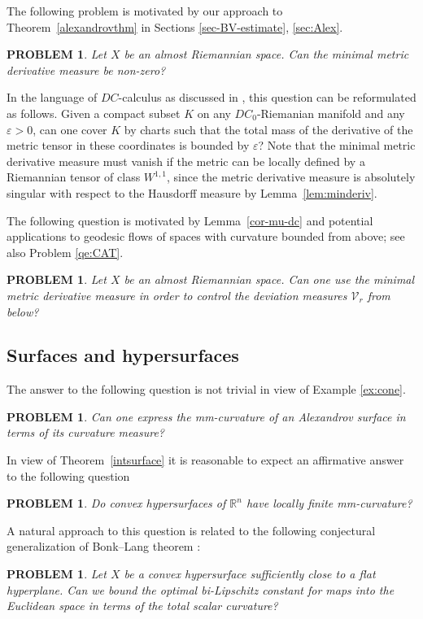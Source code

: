 \documentclass[12pt,leqno,intlimits]{amsart}
\numberwithin{equation}{section}
\newtheorem{quest}[thm]{PROBLEM}
\theoremstyle{definition}
\theoremstyle{remark}
\newcommand{\tref}[1]{Theorem~\ref{#1}}
\newcommand{\lref}[1]{Lemma~\ref{#1}}
\newcommand{\R}{\mathbb{R}}
\begin{document}
The following problem is motivated by our approach to \tref{alexandrovthm} in Sections \ref{sec-BV-estimate}, \ref{sec:Alex}.

\begin{quest} \label{qe:min}
Let $X$ be an almost Riemannian space. Can the minimal metric derivative measure be non-zero?
\end{quest}

In the language of $DC$-calculus as discussed in \cite{AB15}, this question can be reformulated as follows.  Given a compact subset $K$
on any $DC_0$-Riemanian manifold and any $\varepsilon >0$, can one cover $K$ by charts  such that the total mass of the derivative of the metric tensor
in these coordinates is bounded by $\varepsilon$?
Note that the minimal metric derivative measure must vanish if the metric can be locally defined by a Riemannian
tensor of class $W^{1,1}$, since the metric derivative measure is absolutely singular with respect to the Hausdorff measure by \lref{lem:minderiv}.

The following question is motivated by \lref{cor-mu-dc} and potential applications to geodesic flows of spaces with curvature bounded from above; see also Problem \ref{qe:CAT}.

\begin{quest} \label{qe:BV}
Let $X$ be an almost Riemannian space. Can one use the minimal metric derivative measure in order to control the deviation measures $\mathcal{V}_r$ from below?
\end{quest}

\subsection{Surfaces and hypersurfaces}
The answer to the following question is not trivial in view of Example \ref{ex:cone}.

\begin{quest}
Can one express the mm-curvature of an Alexandrov surface in terms of its curvature measure?
\end{quest}

In view of \tref{intsurface} it is reasonable to expect an affirmative answer to the following question
\begin{quest}
Do convex hypersurfaces of $\R^n$ have locally finite mm-curvature?
\end{quest}

A natural approach to this question is related to the following conjectural generalization of Bonk--Lang theorem \cite{Bonk-Lang}:
\begin{quest}
Let $X$ be a convex hypersurface sufficiently close to a flat hyperplane. Can we bound the optimal bi-Lipschitz constant for maps into the Euclidean space in terms of the total scalar curvature?
\end{quest}
\end{document}
